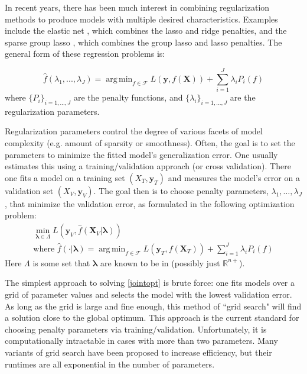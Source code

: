 \documentclass[10pt,letterpaper]{article}
\DeclareMathOperator*{\argmin}{arg\,min}
\begin{document}
In recent years, there has been much interest in combining regularization methods to produce models with multiple desired characteristics. Examples include the elastic net \citep{zou2003regression}, which combines the lasso and ridge penalties, and the sparse group lasso \citep{simon2013sparse}, which combines the group lasso and lasso penalties. The general form of these regression problems is:

\begin{equation} \label {eq:basic}
\hat f(\lambda_1, ..., \lambda_J) = \argmin_{f\in\mathcal{F}} L(\boldsymbol{y}, f (\boldsymbol{X})) + \sum\limits_{i=1}^J \lambda_i P_i(f)
\end{equation}
where $\{P_i\}_{i=1, ..., J}$ are the penalty functions, and $\{\lambda_i\}_{i=1, ..., J}$ are the regularization parameters.

Regularization parameters control the degree of various facets of model complexity (e.g. amount of sparsity or smoothness). Often, the goal is to set the parameters to minimize the fitted model's generalization error. One usually estimates this using a training/validation approach (or cross validation). There one fits a model on a training set $(X_T, \boldsymbol y_T)$ and measures the model's error on a validation set $(X_V, \boldsymbol y_V)$. The goal then is to choose penalty parameters, $\lambda_1, \ldots, \lambda_J$, that minimize the validation error, as formulated in the following optimization problem:
\begin{equation}
\begin{array}{c}
\min_{\boldsymbol{\lambda} \in \Lambda} L(\boldsymbol{y}_V, \hat f (\boldsymbol{X}_V | \boldsymbol{\lambda})) \\
\text{where } \hat f(\cdot | \boldsymbol{\lambda}) = \argmin_{f\in\mathcal{F}} L(\boldsymbol{y}_T, f (\boldsymbol{X}_T)) + \sum\limits_{i=1}^J \lambda_i P_i(f)
\end{array}
\label{jointopt}
\end{equation}
Here $\Lambda$ is some set that $\boldsymbol{\lambda}$ are known to be in (possibly just $\mathbb{R}^{n+}$).

The simplest approach to solving \eqref{jointopt} is brute force: one fits models over a grid of parameter values and selects the model with the lowest validation error. As long as the grid is large and fine enough, this method of ``grid search" will find a solution close to the global optimum. This approach is the current standard for choosing penalty parameters via training/validation. Unfortunately, it is computationally intractable in cases with more than two parameters. Many variants of grid search have been proposed to increase efficiency, but their runtimes are all exponential in the number of parameters.
\end{document}
